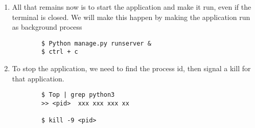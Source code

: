 \begin{enumerate}
    \item All that remains now is to start the application and make it run, even if the terminal is closed. We will make this happen by making the application run as background process
    \begin{lstlisting}
        $ Python manage.py runserver &
        $ ctrl + c 
    \end{lstlisting}
    
    \item To stop the application, we need to find the process id, then signal a kill for that application.
    \begin{lstlisting}
        $ Top | grep python3
        >> <pid>  xxx xxx xxx xx
        
        $ kill -9 <pid>
    \end{lstlisting}
    

\end{enumerate}
    

\cleardoublepage